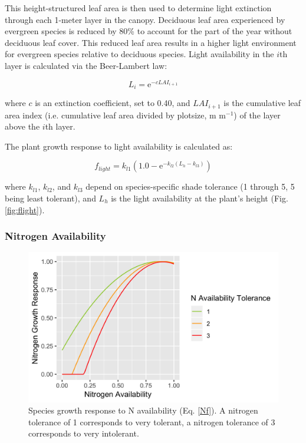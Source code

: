 \documentclass[a4paper, 12pt] {report}
\begin{document}
This height-structured leaf area is then used to determine light extinction through each 1-meter layer in the canopy. Deciduous leaf area experienced by evergreen species is reduced by 80\% to account for the part of the year without deciduous leaf cover. This reduced leaf area results in a higher light environment for evergreen species relative to deciduous species. Light availability in the $i$th layer is calculated via the Beer-Lambert law:

\begin{equation} \label{beerlaw}
L_i = \text{e}^{-cLAI_{i+1}}
\end{equation}

where $c$ is an extinction coefficient, set to 0.40, and $LAI_{i+1}$ is the cumulative leaf area index (i.e. cumulative leaf area divided by plotsize, m m$^{-1}$) of the layer above the $i$th layer.

The plant growth response to light availability is calculated as:

\begin{equation} \label{lightf}
f_{light} = k_{l1}(1.0 - \text{e}^{-k_{l2}(L_h - k_{l3})})
\end{equation}

where $k_{l1}$, $k_{l2}$, and $k_{l3}$ depend on species-specific shade tolerance (1 through 5, 5 being least tolerant), and $L_h$ is the light availability at the plant's height (Fig. \ref{fig:flight}).

\subsubsection{Nitrogen Availability}

\begin{figure}[H]
  \includegraphics[width=0.9\linewidth]{Figures/fertResp.png}
  \caption{Species growth response to N availability (Eq. \ref{Nf}). A nitrogen tolerance of 1 corresponds to very tolerant, a nitrogen tolerance of 3 corresponds to very intolerant.}
  \label{fig:fpoor}
\end{figure}
\end{document}

